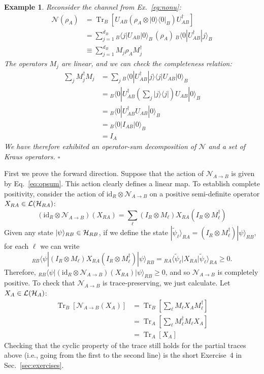 \documentclass[a4paper,11pt]{article}
\newtheorem{example}[thm]{Example}
\newenvironment{eg}{\begin{example}  \rm  }{    \end{example} }
\newcommand{\eop}{{\hspace*{\fill}$\square$}}
\newcommand{\Eq}[1]{Eq.~\eqref{#1}}
\newcommand{\Sec}[1]{Sec.~\ref{#1}}
\DeclareMathOperator{\Tr}{Tr}
\newcommand{\bra}[1]{\langle #1|}
\newcommand{\ket}[1]{|#1\rangle}
\newcommand{\ketbra}[2]{| #1 \rangle \langle #2 |}
\newcommand{\Hil}{{\cal H}}
\newcommand{\mrm}[1]{\mathrm{#1}}
\begin{document}
\begin{eg}
Reconsider the channel from Ex.~\ref{eg:nonu}:
\begin{align*}
\mathcal{N}(\rho_A) &= \Tr_B \left[ U_{AB} \left(\rho_A \otimes \ketbra{0}{0}_B \right) U_{AB}^\dagger \right] \\
&= \sum_{j=1}^{d_B} {}_B\bra{j} U_{AB} \ket{0}_B \, (\rho_A) \, {}_B\bra{0} U_{AB}^\dagger \ket{j}_B \\
&\equiv \sum_{j=1}^{d_B} M_j \rho_A M_j^\dagger
\end{align*}
The operators $M_j$ are linear, and we can check the completeness relation:
\begin{align*}
\sum_j M_j^\dagger M_j &= \sum_j  {}_B\bra{0} U_{AB}^\dagger \ketbra{j}{j} U_{AB} \ket{0}_B \\
&= {}_B\bra{0} U_{AB}^\dagger \left( \sum_j \ketbra{j}{j} \right) U_{AB} \ket{0}_B \\
&= {}_B\bra{0} U_{AB}^\dagger U_{AB} \ket{0}_B \\
&= {}_B\bra{0} I_{AB} \ket{0}_B \\
&= I_A
\end{align*}
We have therefore exhibited an operator-sum decomposition of $\mathcal{N}$ and a set of Kraus operators.
\eop
\end{eg}

 First we prove the forward direction.
Suppose that the action of $\mathcal{N}_{A \rightarrow B}$ is given by \Eq{eq:opsum}.
This action clearly defines a linear map.
To establish complete positivity, consider the action of $\mrm{id}_R \otimes \mathcal{N}_{A \rightarrow B}$ on a positive semi-definite operator $X_{RA} \in \mathcal{L}(\Hil_{RA})$:
\begin{equation}
(\mrm{id}_R \otimes \mathcal{N}_{A \rightarrow B})(X_{RA}) = \sum_\ell (I_R \otimes M_\ell) X_{RA} (I_R \otimes M_\ell^\dagger)
\end{equation}
Given any state $\ket{\psi}_{RB} \in \Hil_{RB}$, if we define the state $\ket{\tilde \psi_\ell}_{RA} = (I_R \otimes M_\ell^\dagger)\ket{\psi}_{RB}$, for each $\ell$ we can write
\begin{equation}
{}_{RB}\bra{\psi} (I_R \otimes M_\ell) X_{RA} (I_R \otimes M_\ell^\dagger) \ket{\psi}_{RB} = {}_{RA}\bra{\tilde \psi_\ell} X_{RA} \ket{\tilde \psi_\ell}_{RA} \geq 0.
\end{equation}
Therefore, ${}_{RB}\bra{\psi}(\mrm{id}_R \otimes \mathcal{N}_{A \rightarrow B})(X_{RA})\ket{\psi}_{RB} \geq 0$, and so $\mathcal{N}_{A \rightarrow B}$ is completely positive.
To check that $\mathcal{N}_{A \rightarrow B}$ is trace-preserving, we just calculate.
Let $X_A \in \mathcal{L}(\Hil_A)$:
\begin{align*}
\Tr_B \left[ \mathcal{N}_{A \rightarrow B}(X_A) \right] &= \Tr_B \left[ \sum_\ell M_\ell X_A M_\ell^\dagger \right] \\
&= \Tr_A \left[ \sum_\ell M_\ell^\dagger M_\ell X_A  \right] \\
&= \Tr_A [X_A]
\end{align*}
Checking that the cyclic property of the trace still holds for the partial traces above (i.e., going from the first to the second line) is the short Exercise~4 in \Sec{sec:exercises}.
\end{document}
